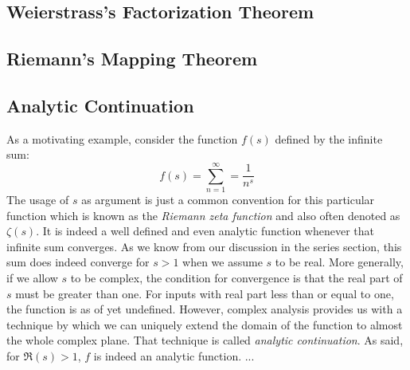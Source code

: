 


\subsection{Weierstrass's Factorization Theorem}








\subsection{Riemann's Mapping Theorem}



\subsection{Analytic Continuation}
As a motivating example, consider the function $f(s)$ defined by the infinite sum:
\begin{equation}
f(s) = \sum_{n=1}^{\infty} = \frac{1}{n^s}
\end{equation}
The usage of $s$ as argument is just a common convention for this particular function which is known as the \emph{Riemann zeta function} and also often denoted as $\zeta (s)$. It is indeed a well defined and even analytic function whenever that infinite sum converges. As we know from our discussion in the series section, this sum does indeed converge for $s > 1$ when we assume $s$ to be real. More generally, if we allow $s$ to be complex, the condition for convergence is that the real part of $s$ must be greater than one. For inputs with real part less than or equal to one, the function is as of yet undefined. However, complex analysis provides us with a technique by which we can uniquely extend the domain of the function to almost the whole complex plane. That technique is called \emph{analytic continuation}. As said, for $\Re(s) > 1$, $f$ is indeed an analytic function. ...

